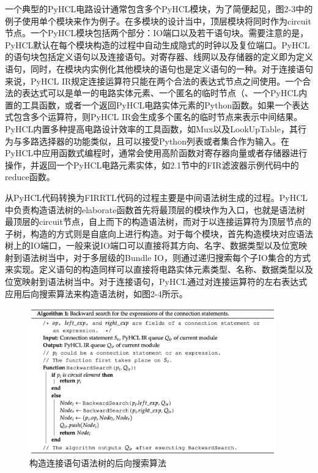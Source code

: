 一个典型的PyHCL电路设计通常包含多个PyHCL模块，为了简便起见，图2-3中的例子使用单个模块来作为例子。在多模块的设计当中，顶层模块将同时作为circuit节点。一个PyHCL模块包括两个部分：IO端口以及若干语句块。需要注意的是，PyHCL默认在每个模块构造的过程中自动生成隐式的时钟以及复位端口。PyHCL的语句块包括定义语句以及连接语句。对寄存器、线网以及存储器的定义即为定义语句，同时，在模块内实例化其他模块的语句也是定义语句的一种。对于连接语句来说，PyHCL IR规定连接运算符只能在两个合法的表达式节点之间使用。一个合法的表达式可以是单一的电路实体元素、一个匿名的临时节点（、一个PyHCL内置的工具函数，或者一个返回PyHCL电路实体元素的Python函数。如果一个表达式包含多个运算符，则PyHCL IR会生成多个匿名的临时节点来表示中间结果。PyHCL内置多种提高电路设计效率的工具函数，如Mux以及LookUpTable，其行为与多路选择器的功能类似，且可以接受Python列表或者集合作为输入。在PyHCL中应用函数式编程时，通常会使用高阶函数对寄存器向量或者存储器进行操作，并返回一个PyHCL电路元素实体，如2.1节中的FIR滤波器示例代码中的reduce函数。

从PyHCL代码转换为FIRRTL代码的过程主要是中间语法树生成的过程。PyHCL中负责构造语法树的elaborate函数首先将最顶层的模块作为入口，也就是语法树最顶层的circuit节点，自上而下的构造语法树，而对于以连接运算符为顶层节点的子树，构造的方式则是自底向上进行构造。对于每个模块，首先构造模块对应语法树上的IO端口，一般来说IO端口可以直接将其方向、名字、数据类型以及位宽映射到语法树当中，对于多层级的Bundle IO，则通过递归搜索每个子IO集合的方式来实现。定义语句的构造同样可以直接将电路实体元素类型、名称、数据类型以及位宽映射到语法树当中。对于连接语句，PyHCL通过对连接运算符的左右表达式应用后向搜索算法来构造语法树，如图2-4所示。

\begin{figure}[htbp]
	\centering
	\includegraphics[width=0.95\textwidth]{Photos/back-end_search.png}
	\caption{构造连接语句语法树的后向搜索算法}
\end{figure}

